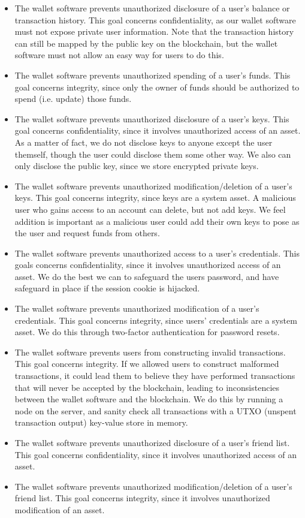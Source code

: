 \documentclass[12pt]{article}
\begin{document}
\begin{itemize}
\item The wallet software prevents unauthorized disclosure of a user's balance or transaction history. This goal concerns confidentiality, as our wallet software must not expose private user information. Note that the transaction history can still be mapped by the public key on the blockchain, but the wallet software must not allow an easy way for users to do this.
\item The wallet software prevents unauthorized spending of a user's funds. This goal concerns integrity, since only the owner of funds should be authorized to spend (i.e. update) those funds.
\item The wallet software prevents unauthorized disclosure of a user's keys. This goal concerns confidentiality, since it involves unauthorized access of an asset. As a matter of fact, we do not disclose keys to anyone except the user themself, though the user could disclose them some other way. We also can only disclose the public key, since we store encrypted private keys.
\item The wallet software prevents unauthorized modification/deletion of a user's keys. This goal concerns integrity, since keys are a system asset. A malicious user who gains access to an account can delete, but not add keys. We feel addition is important as a malicious user could add their own keys to pose as the user and request funds from others.
\item The wallet software prevents unauthorized access to a user's credentials. This goals concerns confidentiality, since it involves unauthorized access of an asset. We do the best we can to safeguard the users password, and have safeguard in place if the session cookie is hijacked.
\item The wallet software prevents unauthorized modification of a user's credentials. This goal concerns integrity, since users' credentials are a system asset. We do this through two-factor authentication for password resets.
\item The wallet software prevents users from constructing invalid transactions. This goal concerns integrity. If we allowed users to construct malformed transactions, it could lead them to believe they have performed transactions that will never be accepted by the blockchain, leading to inconsistencies between the wallet software and the blockchain. We do this by running a node on the server, and sanity check all transactions with a UTXO (unspent transaction output) key-value store in memory.
\item The wallet software prevents unauthorized disclosure of a user's friend list. This goal concerns confidentiality, since it involves unauthorized access of an asset.
\item The wallet software prevents unauthorized modification/deletion of a user's friend list. This goal concerns integrity, since it involves unauthorized modification of an asset.
\end{itemize}
\end{document}
